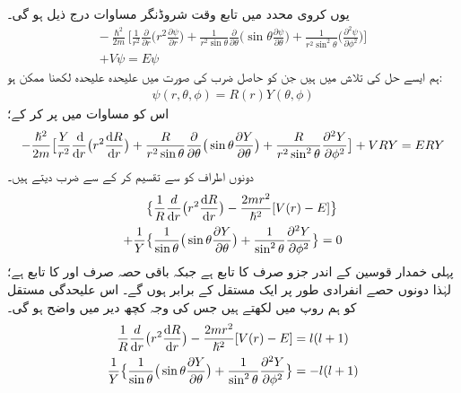 یوں کروی محدد میں تابع وقت شروڈنگر مساوات درج ذیل ہو گی۔ 
\begin{multline}\label{مساوات_ابعادی_لاپلاسی_ب}
-\frac{\hslash^{2}}{2m}\big [\frac{1}{r^{2}}\frac{\partial}{\partial{r}}\big (r^{2}\frac{\partial\psi}{\partial{r}}\big )+\frac{1}{r^{2}\sin{\theta}}\frac{\partial}{\partial{\theta}}\big(\sin{\theta}\frac{\partial\psi}{\partial{\theta}}\big )+\frac{1}{r^{2}\sin^{2}{\theta}}\big(\frac{\partial^{2}\psi}{\partial{\phi^{2}}}\big )\big ]\\
+V\psi=E\psi 
\end{multline}
ہم ایسے حل کی تلاش میں ہیں جن کو حاصل ضرب کی صورت میں علیحدہ علیحدہ لکھنا ممکن ہو:
\begin{align}
\psi(r,\theta,\phi)=R(r)Y(\theta,\phi) 
\end{align}
اس کو مساوات  میں پر کر کے؛
\begin{multline*}
-\frac{\hslash^{2}}{2m}\big [\frac{Y}{r^{2}}\frac{\dif}{\dif{r}}\big (r^{2}\frac{\dif{R}}{\dif{r}}\big )+\frac{R}{r^{2}\sin{\theta}}\frac{\partial}{\partial{\theta}}\big(\sin{\theta}\frac{\partial{Y}}{\partial{\theta}}\big )+\frac{R}{r^{2}\sin^{2}{\theta}}\frac{\partial^{2}{Y}}{\partial{\phi^{2}}}\big ]+VRY=ERY 
\end{multline*}
دونوں اطراف کو  سے تقسیم کر کے   سے ضرب دیتے ہیں۔
\begin{align*}
&\big\{\frac{1}{R}\frac{d}{\dif{r}}\big(r^{2}\frac{\dif{R}}{\dif{r}}\big)-\frac{2mr^{2}}{\hslash^{2}}[V(r)-E]\big\} \\
+\frac{1}{Y}&\big\{\frac{1}{\sin{\theta}}\big(\sin{\theta}\frac{\partial{Y}}{\partial{\theta}}\big)+\frac{1}{\sin^{2}{\theta}}\frac{\partial^{2}{Y}}{\partial{\phi^{2}}}\big\}=0 
\end{align*}
پہلی خمدار قوسین کے اندر جزو صرف  کا تابع ہے جبکہ باقی حصہ صرف     اور      کا تابع ہے؛  لہٰذا دونوں حصے انفرادی طور پر ایک مستقل کے برابر ہوں گے۔ اس علیحدگی مستقل کو ہم   روپ میں لکھتے ہیں جس کی وجہ کچھ دیر میں واضح ہو گی۔
\begin{align}
\frac{1}{R}\frac{d}{\dif{r}}\big(r^{2}\frac{\dif{R}}{\dif{r}}\big)-\frac{2mr^{2}}{\hslash^{2}}[V(r)-E]&=l(l+1)\label{مساوات_ابعاد_رداسی_الف} \\ 
\frac{1}{Y}\big\{\frac{1}{\sin{\theta}}\big(\sin{\theta}\frac{\partial{Y}}{\partial{\theta}}\big)+\frac{1}{\sin^{2}{\theta}}\frac{\partial^{2}{Y}}{\partial{\phi^{2}}}\big\}&=-l(l+1) \label{مساوات_ابعاد_غیر_رداسی_الف}
\end{align}
